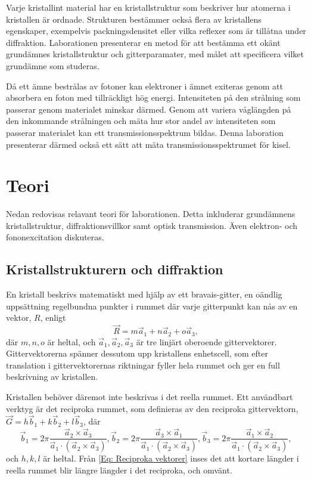\documentclass[12pt, a4paper]{article}
\begin{document}
Varje kristallint material har en kristallstruktur som beskriver hur atomerna i kristallen är ordnade. 
Strukturen bestämmer också flera av kristallens egenskaper, exempelvis packningsdensitet eller vilka reflexer som är tillåtna under diffraktion\cite{Hofmann}. 
Laborationen presenterar en metod för att bestämma ett okänt grundämnes kristallstruktur och gitterparamater, med målet att specificera vilket grundämne som studeras.

Då ett ämne bestrålas av fotoner kan elektroner i ämnet exiteras genom att absorbera en foton med tillräckligt hög energi. 
Intensiteten på den strålning som passerar genom materialet minskar därmed. 
Genom att variera våglängden på den inkommande strålningen och mäta hur stor andel av intensiteten som passerar materialet kan ett transmissionsspektrum bildas\cite{Transmission}. 
Denna laboration presenterar därmed också ett sätt att mäta transmissionsspektrumet för kisel.

\section{Teori}

Nedan redovisas relavant teori för laborationen.
Detta inkluderar grundämnens kristallstruktur, diffraktionsvillkor samt optisk transmission.
Även elektron- och fononexcitation diskuteras.

\subsection{Kristallstrukturern och diffraktion}

En kristall beskrivs matematiskt med hjälp av ett bravais-gitter, en oändlig uppsättning regelbundna punkter i rummet där varje gitterpunkt kan nås av en vektor, $R$, enligt
\begin{equation}
    \vec R = m\vec a_1 + n \vec a_2 + o \vec a_3,
\end{equation}
där $m, n, o$ är heltal, och $\vec a_1, \vec a_2, \vec a_3$ är tre linjärt oberoende gittervektorer. Gittervektorerna spänner dessutom upp kristallens enhetscell, som efter translation i gittervektorernas riktningar fyller hela rummet och ger en full beskrivning av kristallen.

Kristallen behöver däremot inte beskrivas i det reella rummet. Ett användbart verktyg är det reciproka rummet, som definieras av den reciproka gittervektorn, $\vec G = h\vec b_1+k\vec b_2+l\vec b_3$, där
\begin{equation}
    \vec b_1 = 2\pi \dfrac{\vec a_2 \times \vec a_3}{\vec a_1 \cdot(\vec a_2 \times \vec a_3)}, 
    \vec b_2 = 2\pi \dfrac{\vec a_3 \times \vec a_1}{\vec a_1 \cdot(\vec a_2 \times \vec a_3)},
    \vec b_3 = 2\pi \dfrac{\vec a_1 \times \vec a_2}{\vec a_1 \cdot(\vec a_2 \times \vec a_3)},
    \label{Eq: Reciproka vektorer}
\end{equation}
och $h,k,l$ är heltal. Från \ref{Eq: Reciproka vektorer} inses det att kortare längder i reella rummet blir längre längder i det reciproka, och omvänt\cite{Hofmann}.
\end{document}
